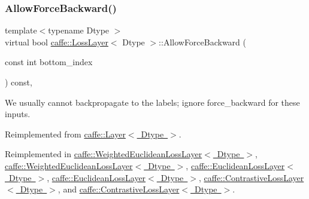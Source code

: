 \mbox{\label{classcaffe_1_1_loss_layer_a36d35155bfe0de53a79c517f33759612}} 
\subsubsection{\texorpdfstring{Allow\+Force\+Backward()}{AllowForceBackward()}\hspace{0.1cm}{\footnotesize\ttfamily [2/2]}}
{\footnotesize\ttfamily template$<$typename Dtype $>$ \\
virtual bool \mbox{\hyperlink{classcaffe_1_1_loss_layer}{caffe\+::\+Loss\+Layer}}$<$ Dtype $>$\+::Allow\+Force\+Backward (\begin{DoxyParamCaption}\item[{const int}]{bottom\+\_\+index }\end{DoxyParamCaption}) const\hspace{0.3cm}{\ttfamily [inline]}, {\ttfamily [virtual]}}

We usually cannot backpropagate to the labels; ignore force\+\_\+backward for these inputs. 

Reimplemented from \mbox{\hyperlink{classcaffe_1_1_layer_a1c0b2bffcd6d57e4bd49f820941badb6}{caffe\+::\+Layer$<$ Dtype $>$}}.



Reimplemented in \mbox{\hyperlink{classcaffe_1_1_weighted_euclidean_loss_layer_a6b996834a2a27bb8d2d9b48873b6cd65}{caffe\+::\+Weighted\+Euclidean\+Loss\+Layer$<$ Dtype $>$}}, \mbox{\hyperlink{classcaffe_1_1_weighted_euclidean_loss_layer_a6b996834a2a27bb8d2d9b48873b6cd65}{caffe\+::\+Weighted\+Euclidean\+Loss\+Layer$<$ Dtype $>$}}, \mbox{\hyperlink{classcaffe_1_1_euclidean_loss_layer_a76dd3fde9f09cb9840f05ee035b5a2c5}{caffe\+::\+Euclidean\+Loss\+Layer$<$ Dtype $>$}}, \mbox{\hyperlink{classcaffe_1_1_euclidean_loss_layer_a76dd3fde9f09cb9840f05ee035b5a2c5}{caffe\+::\+Euclidean\+Loss\+Layer$<$ Dtype $>$}}, \mbox{\hyperlink{classcaffe_1_1_contrastive_loss_layer_af0f16d5119ac6118b670c1966c38fd7d}{caffe\+::\+Contrastive\+Loss\+Layer$<$ Dtype $>$}}, and \mbox{\hyperlink{classcaffe_1_1_contrastive_loss_layer_af0f16d5119ac6118b670c1966c38fd7d}{caffe\+::\+Contrastive\+Loss\+Layer$<$ Dtype $>$}}.

\mbox{\label{classcaffe_1_1_loss_layer_af1620064baefb711e2c767bdc92b6fb1}} 
